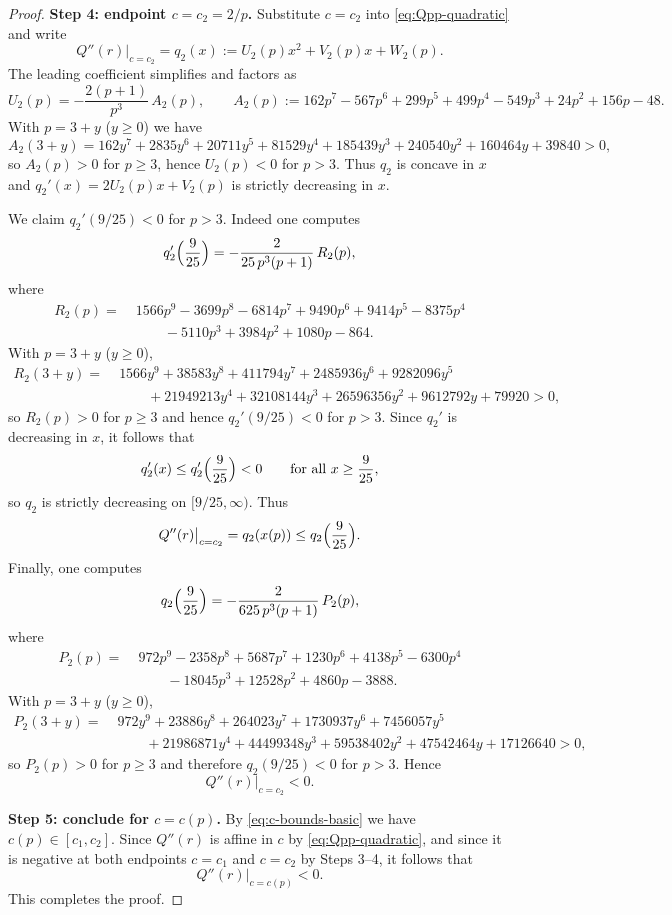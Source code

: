\documentclass[11pt]{article}
\theoremstyle{definition}
\newcommand{\1}{\mathbf{1}}
\begin{document}
\begin{proof}
\medskip
\noindent\textbf{Step 4: endpoint $c=c_{2}=2/p$.}
Substitute $c=c_{2}$ into \eqref{eq:Qpp-quadratic} and write
\[
Q''(r)\big|_{c=c_{2}}=q_{2}(x):=U_{2}(p)x^{2}+V_{2}(p)x+W_{2}(p).
\]
The leading coefficient simplifies and factors as
\[
U_{2}(p)=-\frac{2(p+1)}{p^{3}}\,A_{2}(p),
\qquad
A_{2}(p):=162p^{7}-567p^{6}+299p^{5}+499p^{4}-549p^{3}+24p^{2}+156p-48.
\]
With $p=3+y$ ($y\ge 0$) we have
\[
A_{2}(3+y)=162y^{7}+2835y^{6}+20711y^{5}+81529y^{4}+185439y^{3}+240540y^{2}+160464y+39840>0,
\]
so $A_{2}(p)>0$ for $p\ge 3$, hence $U_{2}(p)<0$ for $p>3$.
Thus $q_{2}$ is concave in $x$ and $q_{2}'(x)=2U_{2}(p)x+V_{2}(p)$ is strictly decreasing in $x$.

We claim $q_{2}'(9/25)<0$ for $p>3$.
Indeed one computes
\[
q_{2}'\Bigl(\frac{9}{25}\Bigr)
=
-\frac{2}{25\,p^{3}(p+1)}\,R_{2}(p),
\]
where
\begin{align*}
R_{2}(p)=\;&1566p^{9}-3699p^{8}-6814p^{7}+9490p^{6}+9414p^{5}-8375p^{4}\\
&\qquad-5110p^{3}+3984p^{2}+1080p-864.
\end{align*}
With $p=3+y$ ($y\ge 0$),
\begin{align*}
R_{2}(3+y)=\;&1566y^{9}+38583y^{8}+411794y^{7}+2485936y^{6}+9282096y^{5}\\
&\qquad+21949213y^{4}+32108144y^{3}+26596356y^{2}+9612792y+79920>0,
\end{align*}
so $R_{2}(p)>0$ for $p\ge 3$ and hence $q_{2}'(9/25)<0$ for $p>3$.
Since $q_{2}'$ is decreasing in $x$, it follows that
\[
q_{2}'(x)\le q_{2}'\Bigl(\frac{9}{25}\Bigr)<0
\qquad\text{for all }x\ge \frac{9}{25},
\]
so $q_{2}$ is strictly decreasing on $[9/25,\infty)$.
Thus 
\[
Q''(r)\big|_{c=c_{2}}=q_{2}(x(p))\le q_{2}\Bigl(\frac{9}{25}\Bigr).
\]
Finally, one computes
\[
q_{2}\Bigl(\frac{9}{25}\Bigr)
=
-\frac{2}{625\,p^{3}(p+1)}\,P_{2}(p),
\]
where
\begin{align*}
P_{2}(p)=\;&972p^{9}-2358p^{8}+5687p^{7}+1230p^{6}+4138p^{5}-6300p^{4}\\
&\qquad-18045p^{3}+12528p^{2}+4860p-3888.
\end{align*}
With $p=3+y$ ($y\ge 0$),
\begin{align*}
P_{2}(3+y)=\;&972y^{9}+23886y^{8}+264023y^{7}+1730937y^{6}+7456057y^{5}\\
&\qquad+21986871y^{4}+44499348y^{3}+59538402y^{2}+47542464y+17126640>0,
\end{align*}
so $P_{2}(p)>0$ for $p\ge 3$ and therefore $q_{2}(9/25)<0$ for $p>3$.
Hence
\[
Q''(r)\big|_{c=c_{2}}<0.
\]

\medskip
\noindent\textbf{Step 5: conclude for $c=c(p)$.}
By \eqref{eq:c-bounds-basic} we have $c(p)\in[c_{1},c_{2}]$.
Since $Q''(r)$ is affine in $c$ by \eqref{eq:Qpp-quadratic},
and since it is negative at both endpoints $c=c_{1}$ and $c=c_{2}$ by Steps 3--4,
it follows that
\[
Q''(r)\big|_{c=c(p)}<0.
\]
This completes the proof.
\end{proof}
\end{document}
